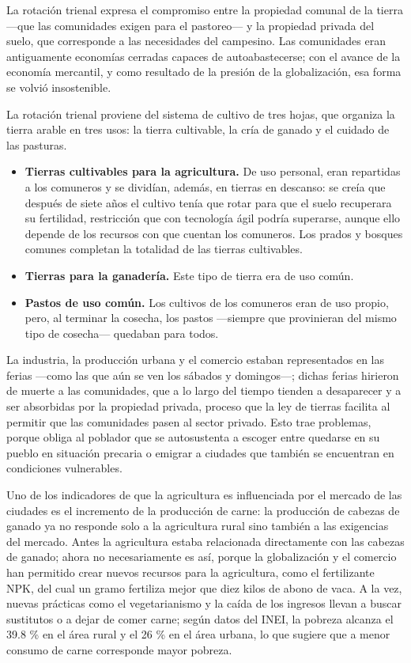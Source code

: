 \documentclass[
  man,
  floatsintext,
  longtable,
  a4paper,
  nolmodern,
  notxfonts,
  notimes,
  12pt,
  colorlinks=true,linkcolor=blue,citecolor=blue,urlcolor=blue]{apa7}
\begin{document}
La rotación trienal expresa el compromiso entre la propiedad comunal de
la tierra ---que las comunidades exigen para el pastoreo--- y la
propiedad privada del suelo, que corresponde a las necesidades del
campesino. Las comunidades eran antiguamente economías cerradas capaces
de autoabastecerse; con el avance de la economía mercantil, y como
resultado de la presión de la globalización, esa forma se volvió
insostenible.

La rotación trienal proviene del sistema de cultivo de tres hojas, que
organiza la tierra arable en tres usos: la tierra cultivable, la cría de
ganado y el cuidado de las pasturas.

\begin{itemize}
\item
  \textbf{Tierras cultivables para la agricultura.} De uso personal,
  eran repartidas a los comuneros y se dividían, además, en tierras en
  descanso: se creía que después de siete años el cultivo tenía que
  rotar para que el suelo recuperara su fertilidad, restricción que con
  tecnología ágil podría superarse, aunque ello depende de los recursos
  con que cuentan los comuneros. Los prados y bosques comunes completan
  la totalidad de las tierras cultivables.
\item
  \textbf{Tierras para la ganadería.} Este tipo de tierra era de uso
  común.
\item
  \textbf{Pastos de uso común.} Los cultivos de los comuneros eran de
  uso propio, pero, al terminar la cosecha, los pastos ---siempre que
  provinieran del mismo tipo de cosecha--- quedaban para todos.
\end{itemize}

La industria, la producción urbana y el comercio estaban representados
en las ferias ---como las que aún se ven los sábados y domingos---;
dichas ferias hirieron de muerte a las comunidades, que a lo largo del
tiempo tienden a desaparecer y a ser absorbidas por la propiedad
privada, proceso que la ley de tierras facilita al permitir que las
comunidades pasen al sector privado. Esto trae problemas, porque obliga
al poblador que se autosustenta a escoger entre quedarse en su pueblo en
situación precaria o emigrar a ciudades que también se encuentran en
condiciones vulnerables.

Uno de los indicadores de que la agricultura es influenciada por el
mercado de las ciudades es el incremento de la producción de carne: la
producción de cabezas de ganado ya no responde solo a la agricultura
rural sino también a las exigencias del mercado. Antes la agricultura
estaba relacionada directamente con las cabezas de ganado; ahora no
necesariamente es así, porque la globalización y el comercio han
permitido crear nuevos recursos para la agricultura, como el
fertilizante NPK, del cual un gramo fertiliza mejor que diez kilos de
abono de vaca. A la vez, nuevas prácticas como el vegetarianismo y la
caída de los ingresos llevan a buscar sustitutos o a dejar de comer
carne; según datos del INEI, la pobreza alcanza el 39.8 \% en el área
rural y el 26 \% en el área urbana, lo que sugiere que a menor consumo
de carne corresponde mayor pobreza.
\end{document}

